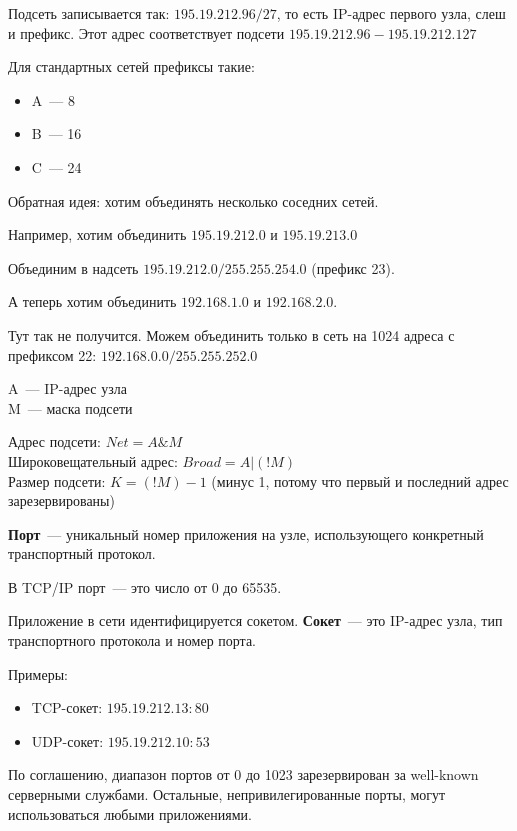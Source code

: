 Подсеть записывается так: $195.19.212.96/27$, то есть IP-адрес первого узла, слеш и префикс. Этот адрес соответствует подсети $195.19.212.96-195.19.212.127$

Для стандартных сетей префиксы такие:
\begin{itemize}
    \item A~--- 8
    \item B~--- 16
    \item C~--- 24
\end{itemize}


Обратная идея: хотим объединять несколько соседних сетей.

Например, хотим объединить $195.19.212.0$ и $195.19.213.0$

Объединим в надсеть $195.19.212.0/255.255.254.0$ (префикс 23).

А теперь хотим объединить $192.168.1.0$ и $192.168.2.0$.

Тут так не получится. Можем объединить только в сеть на 1024 адреса с префиксом 22: $192.168.0.0/255.255.252.0$


A~--- IP-адрес узла\\
M~--- маска подсети

Адрес подсети: $Net = A\&M$\\
Широковещательный адрес: $Broad=A|(!M)$\\
Размер подсети: $K = (!M) - 1$ (минус 1, потому что первый и последний адрес зарезервированы)


{\bf Порт}~--- уникальный номер приложения на узле, использующего конкретный транспортный протокол.

В TCP/IP порт~--- это число от 0 до 65535.

Приложение в сети идентифицируется сокетом. {\bf Сокет}~--- это IP-адрес узла, тип транспортного протокола и номер порта.

Примеры:
\begin{itemize}
    \item TCP-сокет: $195.19.212.13:80$
    \item UDP-сокет: $195.19.212.10:53$
\end{itemize}

По соглашению, диапазон портов от 0 до 1023 зарезервирован за well-known серверными службами. Остальные, непривилегированные порты, могут использоваться любыми приложениями. 